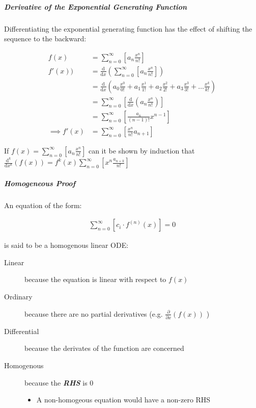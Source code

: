 \documentclass[11pt]{article}
\begin{document}
\subparagraph{Derivative of the Exponential Generating Function}
\label{Derivative-exp-gen-function}
Differentiating the exponential generating function has the effect of shifting the sequence to the backward: \cite{lehmanReadingsMathematicsComputer2010}

\begin{align}
    f\left( x \right) &= \sum^{\infty}_{n= 0}   \left[ a_n \frac{x^n}{n!} \right] \label{eq:exp-pow-series} \\
f'\left( x \right)) &= \frac{\mathrm{d} }{\mathrm{d} x}\left( \sum^{\infty}_{n= 0}   \left[ a_n \frac{x^n}{n!} \right]  \right) \nonumber \\
&= \frac{\mathrm{d}}{\mathrm{d} x} \left( a_0 \frac{x^0}{0!} +  a_1 \frac{x^1}{1!} +  a_2 \frac{x^2}{2!}+  a_3 \frac{x^3}{3! } +  \ldots \frac{x^k}{k!} \right) \nonumber \\
&= \sum^{\infty}_{n= 0}   \left[ \frac{\mathrm{d} }{\mathrm{d} x}\left( a_n \frac{x^n}{n!} \right) \right] \nonumber \\
&= \sum^{\infty}_{n= 0}   {\left[{ \frac{a_n}{{\left({ n- 1 }\right)!}} } x^{n- 1}  \right]} \nonumber \\
\implies f'(x) &= \sum^{\infty}_{n= 0}   {\left[{ \frac{x^n}{n!}a_{n+  1} }\right]} \label{eq:exp-pow-series-sol}
\end{align}

If \(f\left( x \right)= \sum^{\infty}_{n= 0 } \left[ a_n \frac{x^n}{n!} \right]\) can it be shown by induction that \(\frac{\mathrm{d}^k }{\mathrm{d} x^k} \left(  f\left( x \right) \right)= f^{k} \left( x \right) \sum^{\infty}_{n= 0}   \left[ x^n \frac{a_{n+  k}}{n!} \right]\)

\subparagraph{Homogeneous Proof}
\label{sec:org87dd608}
An equation of the form:

\begin{align}
\sum^{\infty}_{n=0} \left[ c_{i} \cdot f^{(n)}(x) \right] = 0 \label{eq:hom-ode}
\end{align}

is said to be a homogenous linear ODE: \cite[Ch. 2]{zillDifferentialEquations2009a}

\begin{description}
\item[{Linear}] because the equation is linear with respect to \(f(x)\)
\item[{Ordinary}] because there are no partial derivatives (e.g. \(\frac{\partial }{\partial x}{\left({ f{\left({ x }\right)} }\right)}\)  )
\item[{Differential}] because the derivates of the function are concerned
\item[{Homogenous}] because the \textbf{\emph{RHS}} is 0
\begin{itemize}
\item A non-homogeous equation would have a non-zero RHS
\end{itemize}
\end{description}
\end{document}

